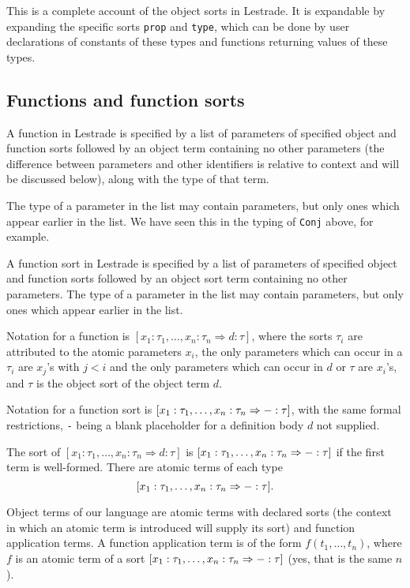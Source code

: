 \documentclass[12pt]{article}
\begin{document}
This is a complete account of the object sorts in Lestrade.  It is expandable by expanding the specific sorts
{\tt prop} and {\tt type}, which can be done by user declarations of constants of these types and functions returning values of these types.

\subsection{Functions and function sorts}

A function in Lestrade is specified by a list of parameters of specified object and function sorts followed
by an object term containing no other parameters (the difference between parameters and other identifiers is relative to context and will be discussed below), along with the type of that term.

The type of a parameter in the list may contain parameters, but only ones which appear earlier in the list.  We have seen this in the typing of {\tt Conj} above, for example. 

A function sort in Lestrade is specified by a list of parameters of specified object and function sorts followed
by an object sort term containing no other parameters.  The type of a parameter in the list may contain parameters, but only ones which appear earlier in the list.

Notation for a function is $[x_1:\tau_1,\ldots,x_n:\tau_n \Rightarrow d:\tau]$, where the sorts $\tau_i$ are
attributed to the atomic parameters $x_i$, the only parameters which can occur in a $\tau_i$ are $x_j$'s with $j<i$
and the only parameters which can occur in $d$ or $\tau$ are $x_i$'s, and $\tau$ is the object sort of the object term $d$.

Notation for a function sort is $[x_1:\tau_1,\ldots,x_n:\tau_n \Rightarrow {\tt -}:\tau]$, with the same formal restrictions, {\tt -} being a blank placeholder for a definition body $d$ not supplied.

The sort of $[x_1:\tau_1,\ldots,x_n:\tau_n \Rightarrow d:\tau]$ is $[x_1:\tau_1,\ldots,x_n:\tau_n \Rightarrow {\tt -}:\tau]$ if the first term is well-formed.  There are atomic terms of each type $$[x_1:\tau_1,\ldots,x_n:\tau_n \Rightarrow {\tt -}:\tau].$$

Object terms of our language are atomic terms with declared sorts (the context in which an atomic term is introduced will supply its sort) and function application terms.  A function application term is of the form $f(t_1,\ldots,t_n)$,
where $f$ is an atomic term of a sort $[x_1:\tau_1,\ldots,x_n:\tau_n \Rightarrow {\tt -}:\tau]$ (yes, that is the same $n$).
\end{document}
